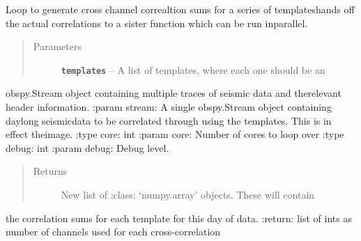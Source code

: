 \documentclass[a4paper,10pt,english]{sphinxmanual}
\begin{document}

\begin{fulllineitems}
\label{submodules/core.match_filter:match_filter._channel_loop}
Loop to generate cross channel correaltion sums for a series of templateshands off the actual correlations to a sister function which can be run inparallel.
\begin{quote}\begin{description}
\item[{Parameters}] \leavevmode
\textbf{\texttt{templates}} -- A list of templates, where each one should be an

\end{description}\end{quote}

obspy.Stream object containing multiple traces of seismic data and therelevant header information.
:param stream: A single obspy.Stream object containing daylong seismicdata to be correlated through using the templates.  This is in effect theimage.
:type core: int
:param core: Number of cores to loop over
:type debug: int
:param debug: Debug level.
\begin{quote}\begin{description}
\item[{Returns}] \leavevmode
New list of :class: `numpy.array' objects.  These will contain

\end{description}\end{quote}

the correlation sums for each template for this day of data.
:return: list of ints as number of channels used for each cross-correlation

\end{fulllineitems}

\end{document}

